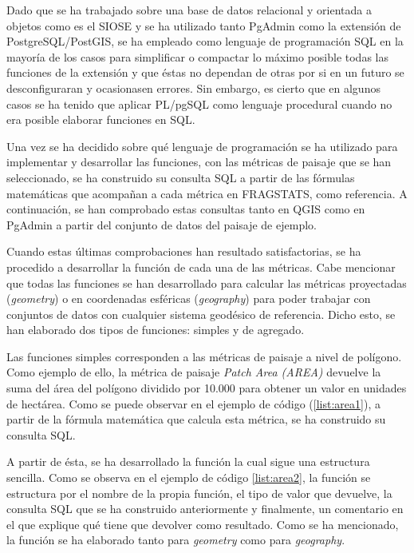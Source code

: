 Dado que se ha trabajado sobre una base de datos relacional y orientada a objetos como es el SIOSE y se ha utilizado tanto PgAdmin como la extensión de PostgreSQL/PostGIS, se ha empleado como lenguaje de programación SQL en la mayoría de los casos para simplificar o compactar lo máximo posible todas las funciones de la extensión y que éstas no dependan de otras por si en un futuro se desconfiguraran y ocasionasen errores. Sin embargo, es cierto que en algunos casos se ha tenido que aplicar PL/pgSQL como lenguaje procedural cuando no era posible elaborar funciones en SQL.

Una vez se ha decidido sobre qué lenguaje de programación se ha utilizado para implementar y desarrollar las funciones, con las métricas de paisaje que se han seleccionado, se ha construido su consulta SQL a partir de las fórmulas matemáticas que acompañan a cada métrica en FRAGSTATS, como referencia. A continuación, se han comprobado estas consultas tanto en QGIS como en PgAdmin a partir del conjunto de datos del paisaje de ejemplo. 

Cuando estas últimas comprobaciones han resultado satisfactorias, se ha procedido a desarrollar la función de cada una de las métricas. Cabe mencionar que todas las funciones se han desarrollado para calcular las métricas proyectadas (\textit{geometry}) o en coordenadas esféricas (\textit{geography}) para poder trabajar con conjuntos de datos con cualquier sistema geodésico de referencia. Dicho esto, se han elaborado dos tipos de funciones: simples y de agregado.

Las funciones simples corresponden a las métricas de paisaje a nivel de polígono. Como ejemplo de ello, la métrica de paisaje \textit{Patch Area (AREA)} devuelve la suma del área del polígono dividido por 10.000 para obtener un valor en unidades de hectárea. Como se puede observar en el ejemplo de código (\ref{list:area1}), a partir de la fórmula matemática que calcula esta métrica, se ha construido su consulta SQL.

\label{list:area1}

A partir de ésta, se ha desarrollado la función la cual sigue una estructura sencilla. Como se observa en el ejemplo de código \ref{list:area2}, la función se estructura por el nombre de la propia función, el tipo de valor que devuelve, la consulta SQL que se ha construido anteriormente y finalmente, un comentario en el que explique qué tiene que devolver como resultado. Como se ha mencionado, la función se ha elaborado tanto para \textit{geometry} como para \textit{geography}.

